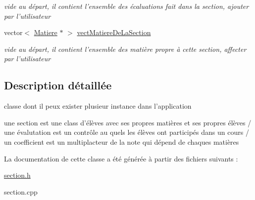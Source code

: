 \begin{DoxyCompactItemize}
\begin{DoxyCompactList}\small\item\em vide au départ, il contient l'ensemble des écaluations fait dans la section, ajouter par l'utilisateur \end{DoxyCompactList}\item 
\hypertarget{class_section_a4cbd4c9d95097ff6ebdc5c9d43a7b43d}{vector$<$ \hyperlink{class_matiere}{Matiere} $\ast$ $>$ \hyperlink{class_section_a4cbd4c9d95097ff6ebdc5c9d43a7b43d}{vect\+Matiere\+De\+La\+Section}}\label{class_section_a4cbd4c9d95097ff6ebdc5c9d43a7b43d}

\begin{DoxyCompactList}\small\item\em vide au départ, il contient l'ensemble des matière propre à cette section, affecter par l'utilisateur \end{DoxyCompactList}\end{DoxyCompactItemize}


\subsection{Description détaillée}
classe dont il peux exister plusieur instance dans l'application 

une section est une class d'élèves avec ses propres matières et ses propres élèves / une évalutation est un contrôle au quels les élèves ont participés dans un cours / un coefficient est un multiplacteur de la note qui dépend de chaques matières 

La documentation de cette classe a été générée à partir des fichiers suivants \+:\begin{DoxyCompactItemize}
\item 
\hyperlink{section_8h}{section.\+h}\item 
section.\+cpp\end{DoxyCompactItemize}
